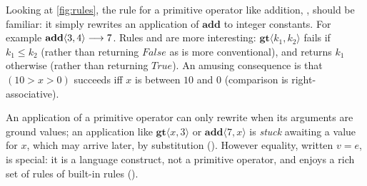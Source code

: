 \documentclass[acmsmall]{acmart}
\newcommand{\Conid}[1]{\mathit{#1}}
\newcommand{\Varid}[1]{\mathit{#1}}
\renewcommand{\leq}{\leqslant}
\begin{document}
Looking at \cref{fig:rules}, the rule for a primitive operator like addition, ,
should be familiar: it simply rewrites an application of \ensuremath{\textbf{add}} to integer
constants.  For example $\textbf{add}\langle\mathrm{3},\mathrm{4}\rangle \longrightarrow \mathrm{7}$.  Rules  and
 are more interesting: \ensuremath{\textbf{gt}\langle\Varid{k}_{\mathrm{1}},\Varid{k}_{\mathrm{2}}\rangle} fails if $k_1 \leq k_2$
(rather than returning \ensuremath{\Conid{False}} as is more conventional), and returns \ensuremath{\Varid{k}_{\mathrm{1}}} otherwise (rather than returning \ensuremath{\Conid{True}}).
An amusing consequence is that \ensuremath{(\mathrm{10}\mathbin{>}\Varid{x}\mathbin{>}\mathrm{0})} succeeds
iff \ensuremath{\Varid{x}} is between \ensuremath{\mathrm{10}} and \ensuremath{\mathrm{0}} (comparison is right-associative).

An application of a primitive operator can only rewrite when its
arguments are ground values; an application like \ensuremath{\textbf{gt}\langle\Varid{x},\mathrm{3}\rangle} or \ensuremath{\textbf{add}\langle\mathrm{7},\Varid{x}\rangle} is \emph{stuck} awaiting a value for \ensuremath{\Varid{x}},
which may arrive later, by substitution ().
However equality, written \ensuremath{\Varid{v}\mathrel{=}\Varid{e}}, is special: it is a language construct, not a primitive operator, and enjoys
a rich set of rules of built-in rules ().
\end{document}
